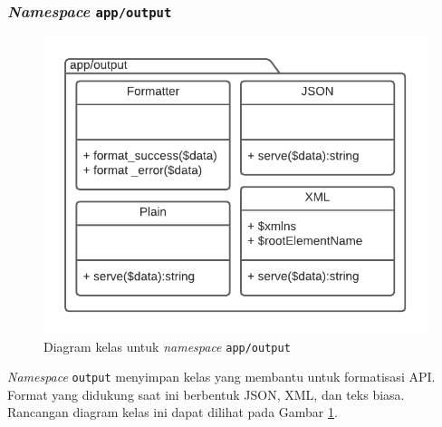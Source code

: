 \subsubsection{\textit{Namespace} \texttt{app/output}}
    \begin{figure}
        \centering
        \includegraphics{Gambar/classmap-be/Classmap - app-output.pdf}
        \caption{Diagram kelas untuk \textit{namespace} \texttt{app/output}}
        \label{fig:classmap_app-output}
    \end{figure}
    \textit{Namespace} \texttt{output} menyimpan kelas yang membantu untuk formatisasi
    API. Format yang didukung saat ini berbentuk JSON, XML, dan teks biasa. Rancangan diagram
    kelas ini dapat dilihat pada Gambar \ref{fig:classmap_app-output}.
    
